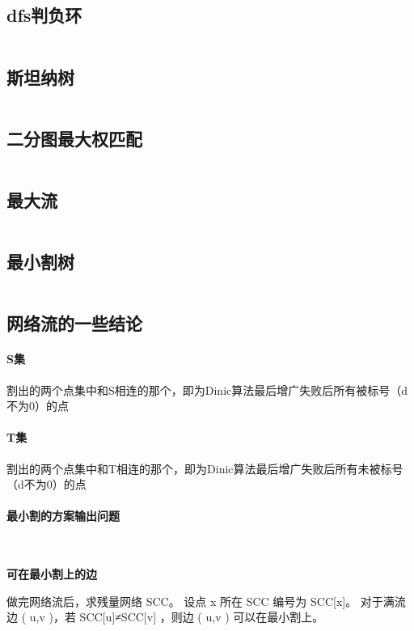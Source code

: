 \documentclass[a4paper,11pt]{article}
\begin{document}
    \subsection{dfs判负环}
    \inputminted[breaklines]{c++}{Graph/dfs判负环.cpp}

    \subsection{斯坦纳树}
    \inputminted[breaklines]{c++}{Graph/斯坦纳树.cpp}

    \subsection{二分图最大权匹配}
    \inputminted[breaklines]{c++}{Graph/KM.cpp}

    \subsection{最大流}
    \inputminted[breaklines]{c++}{Graph/Dinic.cpp}

    \subsection{最小割树}
    \inputminted[breaklines]{c++}{Graph/最小割树.cpp}
    
    \subsection{网络流的一些结论}
    
    \paragraph{S集}割出的两个点集中和S相连的那个，即为Dinic算法最后增广失败后所有被标号（d不为0）的点
     \paragraph{T集}割出的两个点集中和T相连的那个，即为Dinic算法最后增广失败后所有未被标号（d不为0）的点
     \paragraph{最小割的方案输出问题}
     \ 
     
     \textbf{可在最小割上的边}
     
     做完网络流后，求残量网络 SCC。 
     设点 x 所在 SCC 编号为 SCC[x]。 
     对于满流边 ( u,v )，若 SCC[u]≠SCC[v]
     ，则边 ( u,v ) 可以在最小割上。
     
\end{document}
